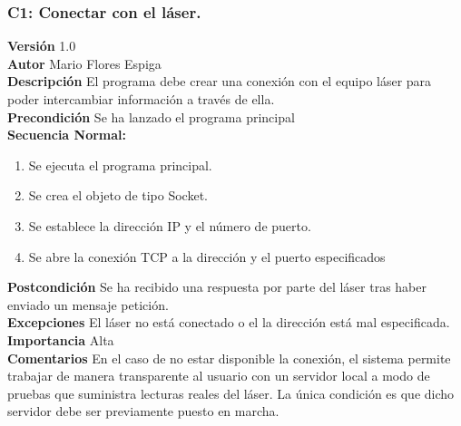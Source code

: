  \subsubsection{ C1: Conectar con el láser.}
\textbf{Versión} 1.0\\
\textbf{Autor} Mario Flores Espiga\\
\textbf{Descripción} El programa debe crear una conexión con el equipo láser para poder intercambiar información a través de ella.\\
\textbf{Precondición} Se ha lanzado el programa principal\\
\textbf{Secuencia Normal:} 
\begin{enumerate}
	\item Se ejecuta el programa principal.
	\item Se crea el objeto de tipo Socket.
	\item Se establece la dirección IP y el número de puerto.
	\item Se abre la conexión TCP a la dirección y el puerto especificados
\end{enumerate}
\textbf{Postcondición} Se ha recibido una respuesta por parte del láser tras haber enviado un mensaje petición.\\
\textbf{Excepciones} El láser no está conectado o el la dirección está mal especificada.\\
\textbf{Importancia} Alta\\
\textbf{Comentarios} En el caso de no estar disponible la conexión, el sistema permite trabajar de manera transparente al usuario con un servidor local a modo de pruebas que suministra lecturas reales del láser. La única condición es que dicho servidor debe ser previamente puesto en marcha.


